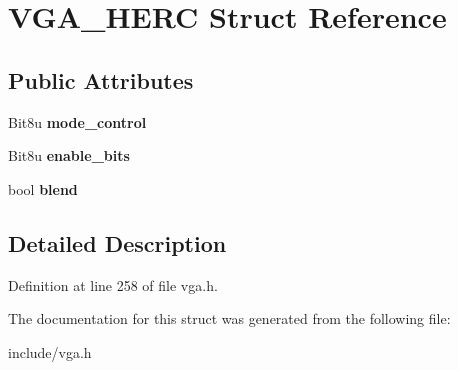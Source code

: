 \hypertarget{structVGA__HERC}{\section{V\-G\-A\-\_\-\-H\-E\-R\-C Struct Reference}
\label{structVGA__HERC}
}
\subsection*{Public Attributes}
\begin{DoxyCompactItemize}
\item 
\hypertarget{structVGA__HERC_ab6ac3f557c940847cfadec99c7f71c74}{Bit8u {\bfseries mode\-\_\-control}}\label{structVGA__HERC_ab6ac3f557c940847cfadec99c7f71c74}

\item 
\hypertarget{structVGA__HERC_a3583e1934895677bfdf4cd907b81c479}{Bit8u {\bfseries enable\-\_\-bits}}\label{structVGA__HERC_a3583e1934895677bfdf4cd907b81c479}

\item 
\hypertarget{structVGA__HERC_af5435dbc6b4458a9565c18d05741f979}{bool {\bfseries blend}}\label{structVGA__HERC_af5435dbc6b4458a9565c18d05741f979}

\end{DoxyCompactItemize}


\subsection{Detailed Description}


Definition at line 258 of file vga.\-h.



The documentation for this struct was generated from the following file\-:\begin{DoxyCompactItemize}
\item 
include/vga.\-h\end{DoxyCompactItemize}
